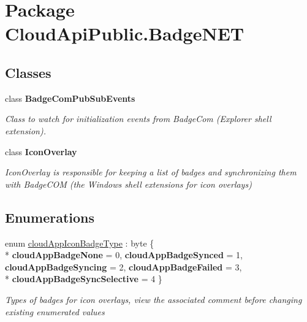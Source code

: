 \hypertarget{namespace_cloud_api_public_1_1_badge_n_e_t}{\section{Package Cloud\-Api\-Public.\-Badge\-N\-E\-T}
\label{namespace_cloud_api_public_1_1_badge_n_e_t}
}
\subsection*{Classes}
\begin{DoxyCompactItemize}
\item 
class {\bfseries Badge\-Com\-Pub\-Sub\-Events}
\begin{DoxyCompactList}\small\item\em Class to watch for initialization events from Badge\-Com (Explorer shell extension). \end{DoxyCompactList}\item 
class {\bfseries Icon\-Overlay}
\begin{DoxyCompactList}\small\item\em Icon\-Overlay is responsible for keeping a list of badges and synchronizing them with Badge\-C\-O\-M (the Windows shell extensions for icon overlays) \end{DoxyCompactList}\end{DoxyCompactItemize}
\subsection*{Enumerations}
\begin{DoxyCompactItemize}
\item 
enum \hyperlink{namespace_cloud_api_public_1_1_badge_n_e_t_afab91a750338fef6bd4ef08f5381c4e4}{cloud\-App\-Icon\-Badge\-Type} \-: byte \{ \\*
{\bfseries cloud\-App\-Badge\-None} = 0, 
{\bfseries cloud\-App\-Badge\-Synced} = 1, 
{\bfseries cloud\-App\-Badge\-Syncing} = 2, 
{\bfseries cloud\-App\-Badge\-Failed} = 3, 
\\*
{\bfseries cloud\-App\-Badge\-Sync\-Selective} = 4
 \}
\begin{DoxyCompactList}\small\item\em Types of badges for icon overlays, view the associated comment before changing existing enumerated values \end{DoxyCompactList}\end{DoxyCompactItemize}


